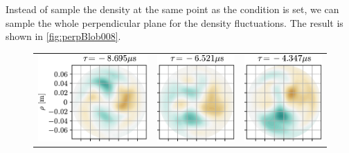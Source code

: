 Instead of sample the density at the same point as the condition is set, we can sample the whole perpendicular plane for the density fluctuations.
The result is shown in \cref{fig:perpBlob008}.
%
\begin{figure}[h!]
\begin{tabular}{ccc}
  \includegraphics{fig/results/blobs/matrix-perp-blobs-B0_0.08-fluct/0} &
  \includegraphics{fig/results/blobs/matrix-perp-blobs-B0_0.08-fluct/1} &
  \includegraphics{fig/results/blobs/matrix-perp-blobs-B0_0.08-fluct/2} \\

\end{tabular}
\end{figure}
